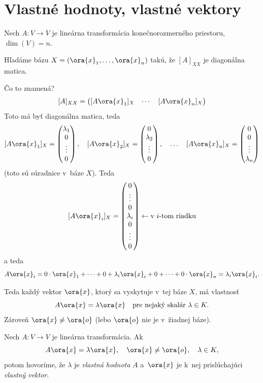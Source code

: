 \section{Vlastné hodnoty, vlastné vektory}

Nech $A \colon V \to V$ je lineárna transformácia konečnorozmerného priestoru, $\dim(V) = n$.

Hľadáme bázu $X = (\ora{x}_1, \dots, \ora{x}_n)$ takú, že $[A]_{XX}$ je diagonálna matica.

Čo to znamená?
\[
  [A]_{XX}
  = \begin{pmatrix}
      [A\ora{x}_1]_X & \cdots & [A\ora{x}_n]_X
    \end{pmatrix}
\]
Toto má byť diagonálna matica, teda
\[
  [A\ora{x}_1]_X
  = \begin{pmatrix} \lambda_1 \\ 0 \\ \vdots \\ 0 \end{pmatrix}, \quad
  [A\ora{x}_2]_X
  = \begin{pmatrix} 0 \\ \lambda_2 \\ \vdots \\ 0 \end{pmatrix}, \quad \dots \quad
  [A\ora{x}_n]_X
  = \begin{pmatrix} 0 \\ 0 \\ \vdots \\ \lambda_n \end{pmatrix}
\]
(toto sú súradnice v~báze $X$). Teda
\[
  [A\ora{x}_i]_X
  = \begin{pmatrix} 0 \\ \vdots \\ 0 \\ \lambda_i \\ 0 \\ \vdots \\ 0 \end{pmatrix}
  \leftarrow \text{v~$i$-tom riadku}
\]
a teda
\[
  A\ora{x}_i
  = 0 \cdot \ora{x}_1 + \dots + 0 + \lambda_i \ora{x}_i + 0 + \dots + 0 \cdot \ora{x}_n
  = \lambda_i \ora{x}_i.
\]

Teda každý vektor $\ora{x}$, ktorý sa vyskytuje v~tej báze $X$, má vlastnosť
\[
  A\ora{x} = \lambda\ora{x}
  \quad \text{pre nejaký skalár } \lambda \in K.
\]
Zároveň $\ora{x} \neq \ora{o}$ (lebo $\ora{o}$ nie je v~žiadnej báze).

\begin{definicia}
\label{def:vlastna-hodnota}
Nech $A \colon V \to V$ je lineárna transformácia. Ak
\[
  A\ora{x} = \lambda\ora{x}, \quad \ora{x} \neq \ora{o}, \quad \lambda \in K,
\]
potom hovoríme, že $\lambda$ je \emph{vlastná hodnota} $A$
a~$\ora{x}$ je k~nej prislúchajúci \emph{vlastný vektor}.
\end{definicia}


